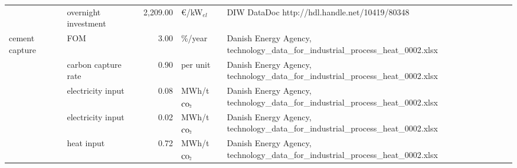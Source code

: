 \begin{longtable}{p{4cm}p{4cm}rp{3cm}p{10cm}}
                      & overnight investment &     2,209.00 &               \euro/kW$_{el}$ &                                                                                                                                                                                                                                                                                        DIW DataDoc http://hdl.handle.net/10419/80348 \\
cement capture & FOM &         3.00 &                       \%/year &                                                                                                                                                                                                                                                    Danish Energy Agency, technology\_data\_for\_industrial\_process\_heat\_0002.xlsx \\
                      & carbon capture rate &         0.90 &                      per unit &                                                                                                                                                                                                                                                    Danish Energy Agency, technology\_data\_for\_industrial\_process\_heat\_0002.xlsx \\
                      & electricity input &         0.08 &            MWh/t$_{\ce{CO2}}$ &                                                                                                                                                                                                                                                    Danish Energy Agency, technology\_data\_for\_industrial\_process\_heat\_0002.xlsx \\
                      & electricity input &         0.02 &            MWh/t$_{\ce{CO2}}$ &                                                                                                                                                                                                                                                    Danish Energy Agency, technology\_data\_for\_industrial\_process\_heat\_0002.xlsx \\
                      & heat input &         0.72 &            MWh/t$_{\ce{CO2}}$ &                                                                                                                                                                                                                                                    Danish Energy Agency, technology\_data\_for\_industrial\_process\_heat\_0002.xlsx \\

\end{longtable}
